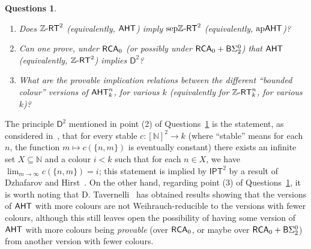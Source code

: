 \documentclass[11pt]{amsart}
\newcommand{\zrt}{\mathnormal{\mathbb Z\text{-}\mathsf{RT}}}
\newcommand{\aht}{\mathnormal{\mathsf{AHT}}}
\newcommand{\apaht}{\mathnormal{\mathrm{ap}\mathsf{AHT}}}
\newcommand{\sepzrt}{\mathnormal{\mathrm{sep}\mathbb Z\text{-}\mathsf{RT}}}
\newcommand{\rca}{\mathnormal{\mathsf{RCA}}_0}
\newtheorem{question}[theorem]{Questions}
\theoremstyle{definition}
\begin{document}
\begin{question}\label{questions}\hfill
\begin{enumerate}
\item Does $\zrt^2$ (equivalently, $\aht$) imply $\sepzrt^2$ (equivalently, $\apaht$)?
\item Can one prove, under $\rca$ (or possibly under $\rca+\mathsf{B}\Sigma_2^0$) that $\aht$ (equivalently, $\zrt^2$) implies $\mathsf{D}^2$?
\item What are the provable implication relations between the different ``bounded colour'' versions of $\aht_k^n$, for various $k$ (equivalently for $\zrt_k^n$, for various $k$)?
\end{enumerate}
\end{question}

The principle $\mathsf{D}^2$ mentioned in point (2) of Questions~\ref{questions} is the statement, as considered in~\cite{dzhafarov-hirst-polarized}, that for every stable $c:[\mathbb N]^2\longrightarrow k$ (where ``stable'' means for each $n$, the function $m\longmapsto c(\{n,m\})$ is eventually constant) there exists an infinite set $X\subseteq\mathbb N$ and a colour $i<k$ such that for each $n\in X$, we have $\displaystyle{\lim_{m\to\infty}c(\{n,m\})=i}$; this statement is implied by $\mathsf{IPT}^2$ by a result of Dzhafarov and Hirst~\cite{dzhafarov-hirst-polarized}. On the other hand, regarding point (3) of Questions~\ref{questions}, it is worth noting that D. Tavernelli~\cite[Section 2.3]{tavernelli} has obtained results showing that the versions of $\aht$ with more colours are not Weihrauch-reducible to the versions with fewer colours, although this still leaves open the possibility of having some version of $\aht$ with more colours being {\it provable} (over $\rca$, or maybe over $\rca+\mathsf{B}\Sigma_2^0$) from another version with fewer colours. 
\end{document}
